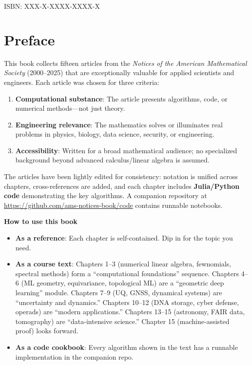 \documentclass[11pt,oneside]{book}
\theoremstyle{definition}
\begin{document}
ISBN: XXX-X-XXXX-XXXX-X

\tableofcontents

\chapter*{Preface}

This book collects fifteen articles from the \textit{Notices of the American Mathematical Society} (2000--2025) that are exceptionally valuable for applied scientists and engineers. Each article was chosen for three criteria:

\begin{enumerate}
    \item \textbf{Computational substance}: The article presents algorithms, code, or numerical methods---not just theory.
    \item \textbf{Engineering relevance}: The mathematics solves or illuminates real problems in physics, biology, data science, security, or engineering.
    \item \textbf{Accessibility}: Written for a broad mathematical audience; no specialized background beyond advanced calculus/linear algebra is assumed.
\end{enumerate}

The articles have been lightly edited for consistency: notation is unified across chapters, cross-references are added, and each chapter includes \textbf{Julia/Python code} demonstrating the key algorithms. A companion repository at \url{https://github.com/ams-notices-book/code} contains runnable notebooks.

\begin{center}
\textbf{How to use this book}
\end{center}

\begin{itemize}
    \item \textbf{As a reference}: Each chapter is self-contained. Dip in for the topic you need.
    \item \textbf{As a course text}: Chapters 1--3 (numerical linear algebra, fewnomials, spectral methods) form a ``computational foundations'' sequence. Chapters 4--6 (ML geometry, equivariance, topological ML) are a ``geometric deep learning'' module. Chapters 7--9 (UQ, GNSS, dynamical systems) are ``uncertainty and dynamics.'' Chapters 10--12 (DNA storage, cyber defense, operads) are ``modern applications.'' Chapters 13--15 (astronomy, FAIR data, tomography) are ``data-intensive science.'' Chapter 15 (machine-assisted proof) looks forward.
    \item \textbf{As a code cookbook}: Every algorithm shown in the text has a runnable implementation in the companion repo.
\end{itemize}
\end{document}
